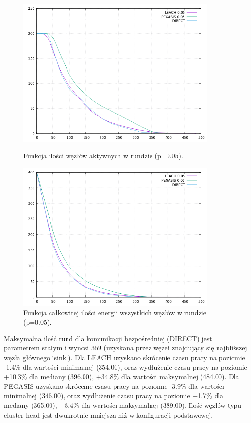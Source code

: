 \documentclass[a4paper,12pt,twoside,openany]{report}
\begin{document}
\begin{figure}[H]
 \centering
 \includegraphics[width=10cm]{images/gnuplot/test_4/nodes_in_round_p005.png}
 \caption{Funkcja ilości węzłów aktywnych w rundzie (p=0.05).}
 \includegraphics[width=10cm]{images/gnuplot/test_4/energy_in_round_p005.png}
 \caption{Funkcja całkowitej ilości energii wszystkich węzłów w rundzie (p=0.05).}
\end{figure}

\par
Maksymalna ilość rund dla komunikacji bezpośredniej (DIRECT) jest parametrem stałym i wynosi 359 (uzyskana przez węzeł znajdujący się najbliższej węzła głównego `sink`).
Dla LEACH uzyskano skrócenie czasu pracy na poziomie -1.4\% dla wartości minimalnej (354.00), oraz wydłużenie czasu pracy na poziomie +10.3\% dla mediany (396.00), +34.8\% dla wartości maksymalnej (484.00).
Dla PEGASIS uzyskano skrócenie czasu pracy na poziomie -3.9\% dla wartości minimalnej (345.00), oraz wydłużenie czasu pracy na poziomie +1.7\% dla mediany (365.00), +8.4\% dla wartości maksymalnej (389.00).
Ilość węzłów typu cluster head jest dwukrotnie mniejsza niż w konfiguracji podstawowej.
\end{document}
